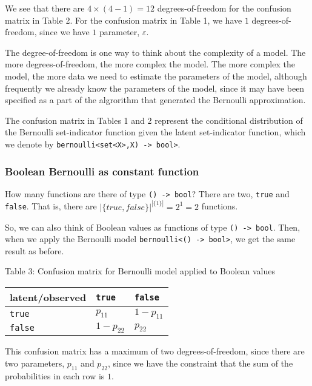 \documentclass[
]{article}
\begin{document}
We see that there are \(4 \times (4 - 1) = 12\) degrees-of-freedom for
the confusion matrix in Table 2. For the confusion matrix in Table 1, we
have \(1\) degrees-of-freedom, since we have \(1\) parameter,
\(\varepsilon\).

The degree-of-freedom is one way to think about the complexity of a
model. The more degrees-of-freedom, the more complex the model. The more
complex the model, the more data we need to estimate the parameters of
the model, although frequently we already know the parameters of the
model, since it may have been specified as a part of the algrorithm that
generated the Bernoulli approximation.

The confusion matrix in Tables 1 and 2 represent the conditional
distribution of the Bernoulli set-indicator function given the latent
set-indicator function, which we denote by
\texttt{bernoulli\textless{}set\textless{}X\textgreater{},X)\ -\textgreater{}\ bool\textgreater{}}.

\hypertarget{boolean-bernoulli-as-constant-function}{%
\subsubsection{Boolean Bernoulli as constant
function}\label{boolean-bernoulli-as-constant-function}}

How many functions are there of type \texttt{()\ -\textgreater{}\ bool}?
There are two, \texttt{true} and \texttt{false}. That is, there are
\(|\{true, false\}|^{|\{1\}|} = 2^1 = 2\) functions.

So, we can also think of Boolean values as functions of type
\texttt{()\ -\textgreater{}\ bool}. Then, when we apply the Bernoulli
model
\texttt{bernoulli\textless{}()\ -\textgreater{}\ bool\textgreater{}}, we
get the same result as before.

Table 3: Confusion matrix for Bernoulli model applied to Boolean values

\begin{longtable}[]{@{}lll@{}}
\toprule
latent/observed & \texttt{true} & \texttt{false}\tabularnewline
\midrule
\endhead
\texttt{true} & \(p_{1 1}\) & \(1-p_{1 1}\)\tabularnewline
\texttt{false} & \(1-p_{2 2}\) & \(p_{2 2}\)\tabularnewline
\bottomrule
\end{longtable}

This confusion matrix has a maximum of two degrees-of-freedom, since
there are two parameters, \(p_{1 1}\) and \(p_{2 2}\), since we have the
constraint that the sum of the probabilities in each row is \(1\).
\end{document}
